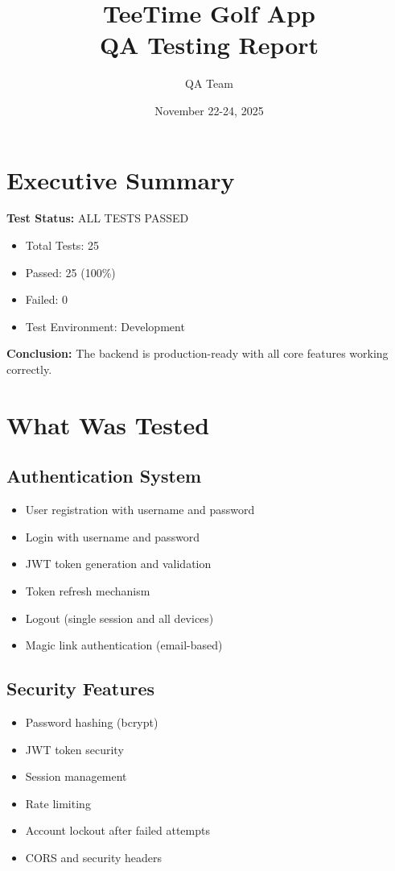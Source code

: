 \documentclass[11pt,a4paper]{article}
\title{\textbf{TeeTime Golf App}\\QA Testing Report}
\author{QA Team}
\date{November 22-24, 2025}
\begin{document}
\maketitle

\section*{Executive Summary}

\textbf{Test Status:} \textcolor{passgreen}{ALL TESTS PASSED}

\begin{itemize}
    \item Total Tests: 25
    \item Passed: 25 (100\%)
    \item Failed: 0
    \item Test Environment: Development
\end{itemize}

\textbf{Conclusion:} The backend is production-ready with all core features working correctly.

\section{What Was Tested}

\subsection{Authentication System}
\begin{itemize}
    \item User registration with username and password
    \item Login with username and password
    \item JWT token generation and validation
    \item Token refresh mechanism
    \item Logout (single session and all devices)
    \item Magic link authentication (email-based)
\end{itemize}

\subsection{Security Features}
\begin{itemize}
    \item Password hashing (bcrypt)
    \item JWT token security
    \item Session management
    \item Rate limiting
    \item Account lockout after failed attempts
    \item CORS and security headers
\end{itemize}
\end{document}
